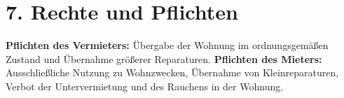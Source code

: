 \section*{7. Rechte und Pflichten}
\textbf{Pflichten des Vermieters:} Übergabe der Wohnung im ordnungsgemäßen Zustand und Übernahme größerer Reparaturen.
\textbf{Pflichten des Mieters:} Ausschließliche Nutzung zu Wohnzwecken, Übernahme von Kleinreparaturen, Verbot der Untervermietung und des Rauchens in der Wohnung.
